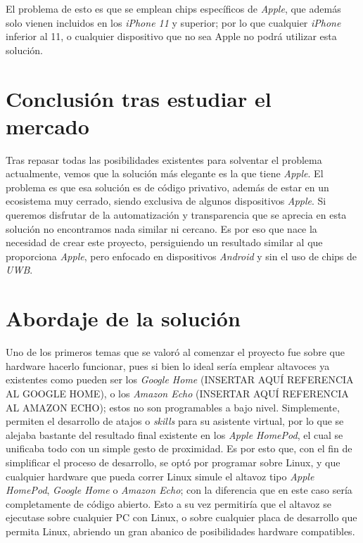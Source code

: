 El problema de esto es que se emplean chips específicos de \emph{Apple}, que
además solo vienen incluidos en los \emph{iPhone 11} y superior; por lo que
cualquier \emph{iPhone} inferior al 11, o cualquier dispositivo que no sea Apple
no podrá utilizar esta solución.

\section{Conclusión tras estudiar el mercado}
Tras repasar todas las posibilidades existentes para solventar el problema
actualmente, vemos que la solución más elegante es la que tiene \emph{Apple}. El
problema es que esa solución es de código privativo, además de estar en un
ecosistema muy cerrado, siendo exclusiva de algunos dispositivos \emph{Apple}.
Si queremos disfrutar de la automatización y transparencia que se aprecia en
esta solución no encontramos nada similar ni cercano. Es por eso que nace la
necesidad de crear este proyecto, persiguiendo un resultado similar al que
proporciona \emph{Apple}, pero enfocado en dispositivos \emph{Android} y sin el
uso de chips de \emph{UWB}.\\

\section{Abordaje de la solución}

Uno de los primeros temas que se valoró al comenzar el proyecto fue sobre que
hardware hacerlo funcionar, pues si bien lo ideal sería emplear altavoces ya
existentes como pueden ser los \emph{Google Home} (INSERTAR AQUÍ REFERENCIA AL
GOOGLE HOME), o los \emph{Amazon Echo} (INSERTAR AQUÍ REFERENCIA AL AMAZON
ECHO); estos no son programables a bajo nivel. Simplemente, permiten el
desarrollo de atajos o \emph{skills} para su asistente virtual, por lo que se
alejaba bastante del resultado final existente en los \emph{Apple HomePod}, el
cual se unificaba todo con un simple gesto de proximidad. Es por esto que, con
el fin de simplificar el proceso de desarrollo, se optó por programar sobre
Linux, y que cualquier hardware que pueda correr Linux simule el altavoz tipo
\emph{Apple HomePod}, \emph{Google Home} o \emph{Amazon Echo}; con la diferencia
que en este caso sería completamente de código abierto. Esto a su vez permitiría
que el altavoz se ejecutase sobre cualquier PC con Linux, o sobre cualquier
placa de desarrollo que permita Linux, abriendo un gran abanico de posibilidades
hardware compatibles. 

